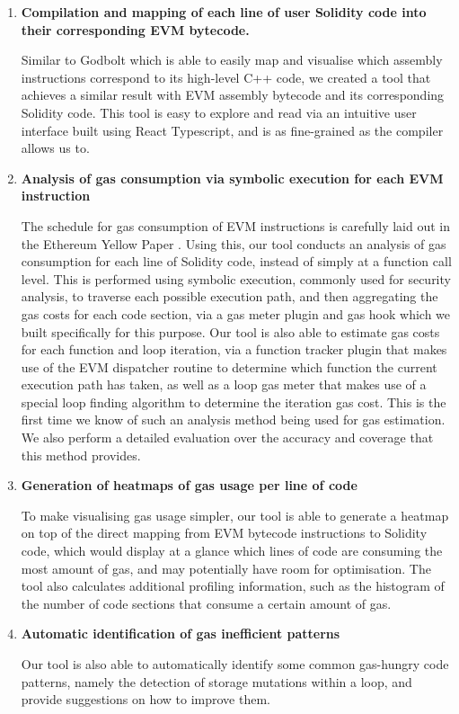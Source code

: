 \begin{enumerate}
    \item \textbf{Compilation and mapping of each line of user Solidity code into their corresponding EVM bytecode.}
    
      Similar to Godbolt which is able to easily map and visualise which assembly
      instructions correspond to its high-level C++ code, we created a tool that achieves a
      similar result with EVM assembly bytecode and its corresponding Solidity code.
      This tool is easy to explore and read via an intuitive user interface built using React
      Typescript, and is as fine-grained as the compiler allows us to.
      
    \item \textbf{Analysis of gas consumption via symbolic execution for each EVM instruction}
    
      The schedule for gas consumption of EVM instructions is carefully laid out 
      in the Ethereum Yellow Paper \cite{ethereumyellowpaper}. Using this,
      our tool conducts an analysis of gas consumption for each line
      of Solidity code, instead of simply at a function call level. This is performed
      using symbolic execution, commonly used for security analysis, to traverse each possible execution path, 
      and then aggregating the gas costs for each code section, via a gas meter plugin and gas hook which
      we built specifically for this purpose. Our tool is also able to estimate gas costs
      for each function and loop iteration, via a function tracker plugin that makes use of
      the EVM dispatcher routine to determine which function the current execution path has taken,
      as well as a loop gas meter that makes use of a special loop finding algorithm to determine the
      iteration gas cost. This is the first time we know 
      of such an analysis method being used for gas estimation. We also perform a detailed 
      evaluation over the accuracy and coverage that this method provides.

    \item \textbf{Generation of heatmaps of gas usage per line of code}
    
      To make visualising gas usage simpler, our tool is able to generate a heatmap on top of
      the direct mapping from EVM bytecode instructions to Solidity code, which would 
      display at a glance which lines of code are consuming the most amount of gas, and 
      may potentially have room for optimisation. The tool also calculates additional
      profiling information, such as the histogram of the number of code sections that 
      consume a certain amount of gas.

    \item \textbf{Automatic identification of gas inefficient patterns}
      
      Our tool is also able to automatically identify some common gas-hungry code patterns, 
      namely the detection of storage mutations within a loop, 
      and provide suggestions on how to improve them.
      
\end{enumerate}

